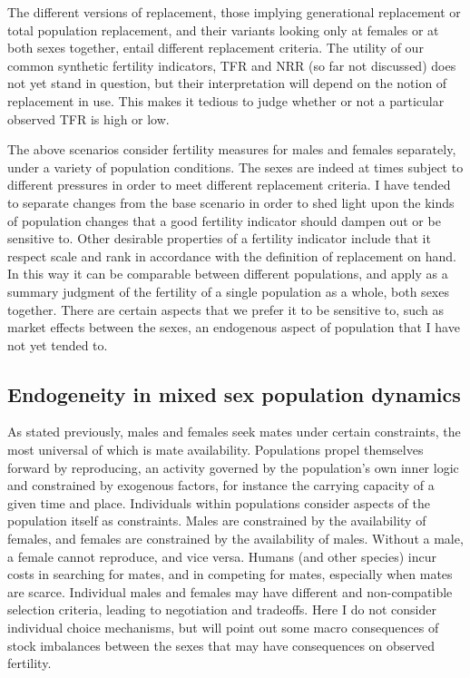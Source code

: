 \documentclass[reqno,12pt,oneside,a4paper]{report} %
\theoremstyle{plain}
\theoremstyle{definition}
\theoremstyle{remark}
\numberwithin{theorem}{chapter}     %
\begin{document}
The different versions of replacement, those implying generational replacement or total population replacement, and their variants looking only at females or at both sexes together, entail different replacement criteria. The utility of our common synthetic fertility indicators, TFR and NRR (so far not discussed) does not yet stand in question, but their interpretation will depend on the notion of replacement in use. This makes it tedious to judge whether or not a particular observed TFR is high or low. 

The above scenarios consider fertility measures for males and females separately, under a variety of population conditions. The sexes are indeed at times subject to different pressures in order to meet different replacement criteria. I have tended to separate changes from the base scenario in order to shed light upon the kinds of population changes that a good fertility indicator should dampen out or be sensitive to. Other desirable properties of a fertility indicator include that it respect scale and rank in accordance with the definition of replacement on hand. In this way it can be comparable between different populations, and apply as a summary judgment of the fertility of a single population as a whole, both sexes together. There are certain aspects that we prefer it to be sensitive to, such as market effects between the sexes, an endogenous aspect of population that I have not yet tended to. 

	\subsection{Endogeneity in mixed sex population dynamics}

As stated previously, males and females seek mates under certain constraints, the most universal of which is mate availability. Populations propel themselves forward by reproducing, an activity governed by the population's own inner logic and constrained by exogenous factors, for instance the carrying capacity of a given time and place. Individuals within populations consider aspects of the population itself as constraints. Males are constrained by the availability of females, and females are constrained by the availability of males. Without a male, a female cannot reproduce, and vice versa. Humans (and other species) incur costs in searching for mates, and in competing for mates, especially when mates are scarce. Individual males and females may have different and non-compatible selection criteria, leading to negotiation and tradeoffs. Here I do not consider individual choice mechanisms, but will point out some macro consequences of stock imbalances between the sexes that may have consequences on observed fertility.
\end{document}
